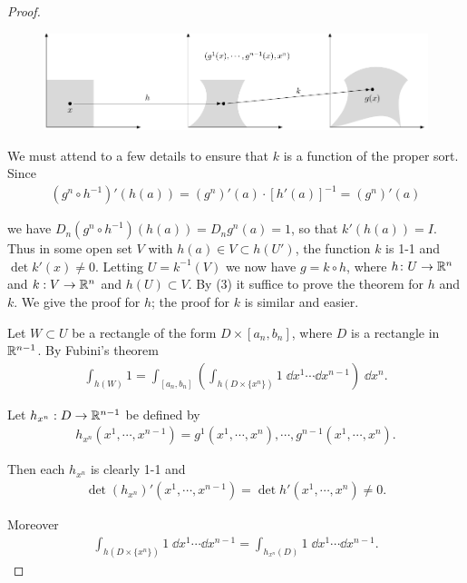 \begin{proof}
\clearpage
\begin{figure}[!htb]
  \centering
  \includegraphics[width=1.4\linewidth, angle=90]{./pics/Fig3-3.pdf}
  \caption{}
  \label{Fig 3-3}
\end{figure}

\clearpage
We must attend to a few details to ensure that $k$ is a function
of the proper sort. Since
\begin{align*}
  (g^n\circ h^{-1})'(h(a)) = (g^n)'(a) \cdot [h'(a)]^{-1} = (g^n)'(a)
\end{align*}

we have $D_n(g^n\circ h^{-1})(h(a)) = D_ng^n(a) = 1$, so that $k'(h(a))=I$. Thus 
in some open set $V$ with $h(a)\in V\subset h(U')$, the function $k$ is 1-1 and 
$\det k'(x)\neq 0$. Letting $U=k^{-1}(V)$ we now have $g=k\circ h$, where $h\colon{}U\to \mathbb{R}^n$
and $k:V\to \mathbb{R}^n$ and $h(U)\subset V$. By (3) it suffice to prove the theorem for $h$
and $k$. We give the proof for $h$; the proof for $k$ is similar and easier.

Let $W\subset U$ be a rectangle of the form $D\times [a_n,b_n]$, where $D$ is a rectangle in 
$\mathbb{R}^{n-1}$. By Fubini's theorem 
\begin{align*}
  \int_{h(W)} 1 = 
  \int_{[a_n, b_n]} \left(\int_{h(D\times \{x^n\})} 1\;\dd x^1\cdots \dd x^{n-1}\right)\;\dd x^n.
\end{align*}

Let $h_{x^n}: D\to \mathbb{R}^{n-1}$ be defined by 
\begin{align*}
    h_{x^n}(x^1, \cdots, x^{n-1}) = g^1(x^1, \cdots, x^n),\cdots, g^{n-1}(x^1, \cdots, x^n).
\end{align*}

Then each $h_{x^n}$ is clearly 1-1 and 
\begin{align*}
    \det (h_{x^n})'(x^1, \cdots, x^{n-1}) 
    = 
    \det h'(x^1, \cdots, x^n) \neq 0.
\end{align*}

Moreover 
\begin{align*}
    \int_{h(D\times \{x^n\})} 1\;\dd x^1\cdots \dd x^{n-1} 
    = 
    \int_{h_{x^n}(D)} 1\;\dd x^1\cdots \dd x^{n-1}.
\end{align*}


\end{proof}
